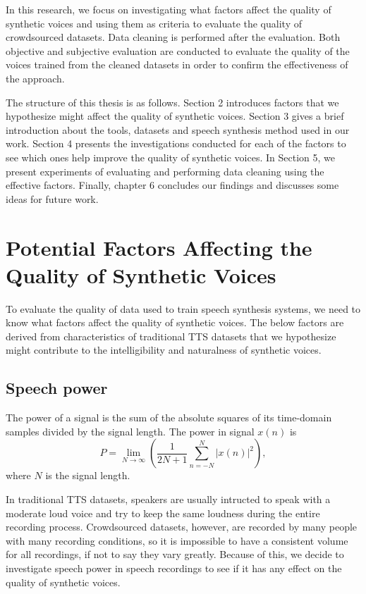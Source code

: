 \documentclass[12pt]{article}
\begin{document}
In this research, we focus on investigating what factors affect the quality of synthetic voices and using them as criteria to evaluate the quality of crowdsourced datasets. Data cleaning is performed after the evaluation. Both objective and subjective evaluation are conducted to evaluate the quality of the voices trained from the cleaned datasets in order to confirm the effectiveness of the approach.

The structure of this thesis is as follows. Section 2 introduces factors that we hypothesize might affect the quality of synthetic voices. Section 3 gives a brief introduction about the tools, datasets and speech synthesis method used in our work. Section 4 presents the investigations conducted for each of the factors to see which ones help improve the quality of synthetic voices. In Section 5, we present experiments of evaluating and performing data cleaning using the effective factors. Finally, chapter 6 concludes our findings and discusses some ideas for future work.
 

\clearpage
\section{Potential Factors Affecting the Quality of Synthetic Voices}\label{sec_potentialFactors}
To evaluate the quality of data used to train speech synthesis systems, we need to know what factors affect the quality of synthetic voices. The below factors are derived from characteristics of traditional TTS datasets that we hypothesize might contribute to the intelligibility and naturalness of synthetic voices.

\subsection{Speech power}\label{subsec_speechPower}
The power of a signal is the sum of the absolute squares of its time-domain samples divided by the signal length. The power in signal $x(n)$ is
\begin{equation}\label{exp_power}
    P = \lim_{N\to\infty} (\frac{1}{2N+1}\sum_{n=-N}^{N} |x(n)|^2),
\end{equation}
where $N$ is the signal length.

In traditional TTS datasets, speakers are usually intructed to speak with a moderate loud voice and try to keep the same loudness during the entire recording process. Crowdsourced datasets, however, are recorded by many people with many recording conditions, so it is impossible to have a consistent volume for all recordings, if not to say they vary greatly. Because of this, we decide to investigate speech power in speech recordings to see if it has any effect on the quality of synthetic voices.
\end{document}
